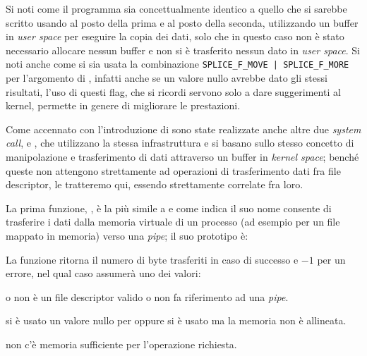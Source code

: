 Si noti come il programma sia concettualmente identico a quello che si sarebbe
scritto usando  al posto della prima  e 
al posto della seconda, utilizzando un buffer in \textit{user space} per
eseguire la copia dei dati, solo che in questo caso non è stato necessario
allocare nessun buffer e non si è trasferito nessun dato in \textit{user
  space}.  Si noti anche come si sia usata la combinazione
\texttt{SPLICE\_F\_MOVE | SPLICE\_F\_MORE } per l'argomento  di
, infatti anche se un valore nullo avrebbe dato gli stessi
risultati, l'uso di questi flag, che si ricordi servono solo a dare
suggerimenti al kernel, permette in genere di migliorare le prestazioni.

Come accennato con l'introduzione di  sono state realizzate anche
altre due \textit{system call},  e , che utilizzano
la stessa infrastruttura e si basano sullo stesso concetto di manipolazione e
trasferimento di dati attraverso un buffer in \textit{kernel space}; benché
queste non attengono strettamente ad operazioni di trasferimento dati fra file
descriptor, le tratteremo qui, essendo strettamente correlate fra loro.

La prima funzione, , è la più simile a  e come
indica il suo nome consente di trasferire i dati dalla memoria virtuale di un
processo (ad esempio per un file mappato in memoria) verso una \textit{pipe};
il suo prototipo è:

\begin{funcproto}{
}

{La funzione ritorna il numero di byte trasferiti in caso di successo e $-1$
  per un errore, nel qual caso  assumerà uno dei valori:
  \begin{errlist}
    \item[\errcode{EBADF}] o  non è un file descriptor valido o non
      fa riferimento ad una \textit{pipe}.
    \item[\errcode{EINVAL}] si è usato un valore nullo per 
      oppure si è usato  ma la memoria non è allineata.
    \item[\errcode{ENOMEM}] non c'è memoria sufficiente per l'operazione
      richiesta.
  \end{errlist}
}
\end{funcproto}

